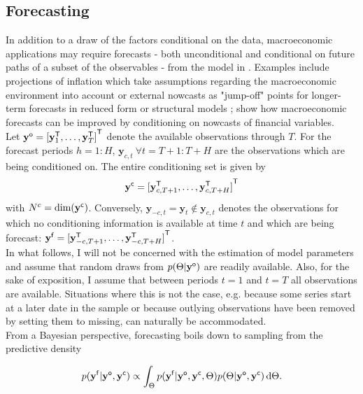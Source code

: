 \documentclass[notitlepage,a4paper,12pt]{article}
\newcommand{\transpose}[1]{{#1}^{\sf{T}}}
\begin{document}
\subsection{Forecasting}

In addition to a draw of the factors conditional on the data, macroeconomic applications may require forecasts - both unconditional and conditional on future paths of a subset of the observables - from the model in . Examples include projections of inflation which take assumptions regarding the macroeconomic environment into account \citep{giannone_etal_2014_ijf} or external nowcasts as "jump-off" points for longer-term forecasts in reduced form or structural models \citep{faustwright2009_jbes,wolters2015_jae}; \citet{knotekzaman2019_ijof} show how macroeconomic forecasts can be improved by conditioning on nowcasts of financial variables.\\

Let $\mathbf{y}^{\sf{o}} = \transpose{[\mathbf{y}^{\sf{T}}_{1}, \dots, \mathbf{y}^{\sf{T}}_{T}]}$ denote the available observations through $T$. For the forecast periods $h = 1:H$, $\mathbf{y}_{c,t}\: \forall t = T+1:T+H$ are the observations which are being conditioned on. The entire conditioning set is given by 
$$
\mathbf{y}^{\sf{c}} = \transpose{[\mathbf{y}^{\sf{T}}_{c,T+1}, \dots, \mathbf{y}^{\sf{T}}_{c,T+H}]}
$$ 
with $N^c = \text{dim}(\mathbf{y}^{\sf{c}})$. Conversely, $\mathbf{y}_{-c,t} = \mathbf{y}_t\notin\mathbf{y}_{c,t}$ denotes the observations for which no conditioning information is available at time $t$ and which are being forecast: $\mathbf{y}^{\sf{f}} = \transpose{[\mathbf{y}^{\sf{T}}_{-c,T+1}, \dots, \mathbf{y}^{\sf{T}}_{-c,T+H}]}$.\\

In what follows, I will not be concerned with the estimation of model parameters and assume that random draws from $p(\Theta|\mathbf{y}^{\sf{o}})$ are readily available. Also, for the sake of exposition, I assume that between periods $t=1$ and $t=T$ all observations are available. Situations where this is not the case, e.g. because some series start at a later date in the sample or because outlying observations have been removed by setting them to missing, can naturally be accommodated.\\

From a Bayesian perspective, forecasting boils down to sampling from the predictive density 

\begin{equation}\label{eqn:preddens}    
    p(\mathbf{y^{\sf{f}}}|\mathbf{y^{\sf{o}}}, \mathbf{y^{\sf{c}}}) \propto \int_{\Theta} p(\mathbf{y^{\sf{f}}}|\mathbf{y^{\sf{o}}},\mathbf{y^{\sf{c}}}, \Theta) p(\Theta|\mathbf{y^{\sf{o}}}, \mathbf{y^{\sf{c}}})\, \text{d}\Theta.
\end{equation}
\end{document}
